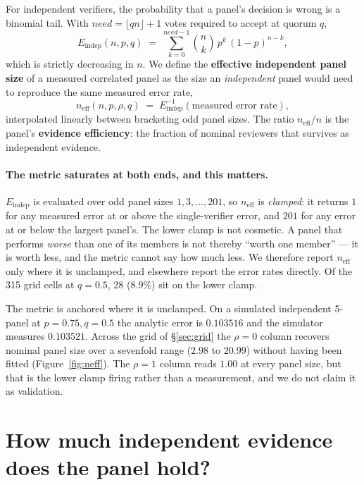 \documentclass[11pt,a4paper]{article}
\newcommand{\neff}{n_{\mathrm{eff}}}
\begin{document}
For independent verifiers, the probability that a panel's decision is wrong is a
binomial tail. With $\mathit{need} = \lfloor qn \rfloor + 1$ votes required to
accept at quorum $q$,
\begin{equation}
E_{\mathrm{indep}}(n, p, q) \;=\; \sum_{k=0}^{\mathit{need}-1} \binom{n}{k}\, p^{k}\,(1-p)^{n-k},
\end{equation}
which is strictly decreasing in $n$. We define the \textbf{effective independent
panel size} of a measured correlated panel as the size an \emph{independent}
panel would need to reproduce the same measured error rate,
\begin{equation}
\neff(n, p, \rho, q) \;=\; E_{\mathrm{indep}}^{-1}\!\left( \text{measured error rate} \right),
\end{equation}
interpolated linearly between bracketing odd panel sizes. The ratio $\neff/n$ is
the panel's \textbf{evidence efficiency}: the fraction of nominal reviewers that
survives as independent evidence.

\paragraph{The metric saturates at both ends, and this matters.}
$E_{\mathrm{indep}}$ is evaluated over odd panel sizes $1, 3, \dots, 201$, so
$\neff$ is \emph{clamped}: it returns $1$ for any measured error at or above the
single-verifier error, and $201$ for any error at or below the largest panel's.
The lower clamp is not cosmetic. A panel that performs \emph{worse} than one of
its members is not thereby ``worth one member'' --- it is worth less, and the
metric cannot say how much less. We therefore report $\neff$ only where it is
unclamped, and elsewhere report the error rates directly. Of the 315 grid cells
at $q=0.5$, 28 ($8.9\%$) sit on the lower clamp.

The metric is anchored where it is unclamped. On a simulated independent 5-panel
at $p = 0.75, q = 0.5$ the analytic error is $0.103516$ and the simulator
measures $0.103521$. Across the grid of \S\ref{sec:grid} the $\rho = 0$ column
recovers nominal panel size over a sevenfold range ($2.98$ to $20.99$) without
having been fitted (Figure~\ref{fig:neff}). The $\rho = 1$ column reads $1.00$
at every panel size, but that is the lower clamp firing rather than a
measurement, and we do not claim it as validation.

\section{How much independent evidence does the panel hold?}
\label{sec:measure}
\end{document}
